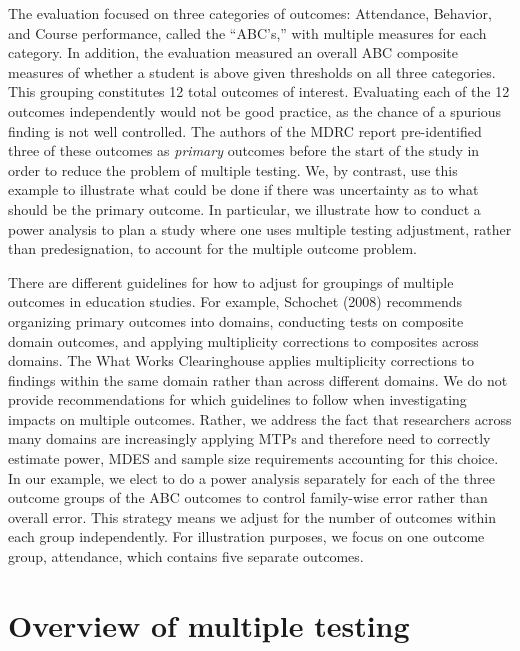 \documentclass[
]{article}
\begin{document}
The evaluation focused on three categories of outcomes: Attendance,
Behavior, and Course performance, called the ``ABC's,'' with multiple
measures for each category. In addition, the evaluation measured an
overall ABC composite measures of whether a student is above given
thresholds on all three categories. This grouping constitutes 12 total
outcomes of interest. Evaluating each of the 12 outcomes independently
would not be good practice, as the chance of a spurious finding is not
well controlled. The authors of the MDRC report pre-identified three of
these outcomes as \emph{primary} outcomes before the start of the study
in order to reduce the problem of multiple testing. We, by contrast, use
this example to illustrate what could be done if there was uncertainty
as to what should be the primary outcome. In particular, we illustrate
how to conduct a power analysis to plan a study where one uses multiple
testing adjustment, rather than predesignation, to account for the
multiple outcome problem.

There are different guidelines for how to adjust for groupings of
multiple outcomes in education studies. For example, Schochet (2008)
recommends organizing primary outcomes into domains, conducting tests on
composite domain outcomes, and applying multiplicity corrections to
composites across domains. The What Works Clearinghouse applies
multiplicity corrections to findings within the same domain rather than
across different domains. We do not provide recommendations for which
guidelines to follow when investigating impacts on multiple outcomes.
Rather, we address the fact that researchers across many domains are
increasingly applying MTPs and therefore need to correctly estimate
power, MDES and sample size requirements accounting for this choice. In
our example, we elect to do a power analysis separately for each of the
three outcome groups of the ABC outcomes to control family-wise error
rather than overall error. This strategy means we adjust for the number
of outcomes within each group independently. For illustration purposes,
we focus on one outcome group, attendance, which contains five separate
outcomes.

\section{Overview of multiple testing}
\label{sec:mtp_overview}
\end{document}
